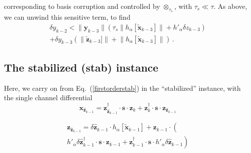 \documentclass[letterpaper,twocolumn,amsmath,amsfont,amssymb,english,aps,jcp,preprintnumbers,groupaddress,nofootinbib,tightenlines,floatfix]{revtex4}
\newcommand{\mat}[1]{\boldsymbol{#1}}
\newcommand{\ots}{ {\scriptstyle \otimes}_{ \! \tau_s } }
\theoremstyle{plain}
\theoremstyle{remark}
\theoremstyle{plain}
\begin{document}

corresponding to  basis corruption and controlled by $\ots$, with $\tau_s \ll \tau$. 
As above, we can unwind this sensitive term, to find 
\begin{multline}
\delta y_{k-2} <   \lVert \mat{y}_{k-3} \rVert  \left( \tau_s \lVert h_\alpha [ \widetilde{\mat{x}}_{k-3}] \rVert + h'_\alpha \delta z_{k-3} \right )\\
+  \delta y_{k-3}  \left( \lVert \widetilde{\mat{z}}_{k-3}]  \rVert + \lVert h_\alpha [ \widetilde{\mat{x}}_{k-3}]  \rVert
  \right)
\, .
\end{multline}


\subsection{The stabilized  (stab) instance}

Here, we carry on from Eq.~(\ref{firstorderstab}) in the ``stabilized'' instance, with the single channel differential 
\begin{equation}
 \mat{x}_{\widehat{\mat{z}}_{k-1}} =   \mat{z}^\dagger_{\widehat{\mat{z}}_{k-1}} \cdot \mat{s} \cdot \mat{z}_{k} + 
                                  \mat{z}^\dagger_k \cdot \mat{s} \cdot \mat{z}_{\widehat{\mat{z}}_{k-1}} 
\end{equation}



\begin{multline}
\mat{z}_{\widehat{\mat{z}}_{k-1} } = \delta \widehat{\mat{z}}_{k-1} \cdot h_\alpha[ \widetilde{\mat{x}}_{k-1} ] + \mat{z}_{k-1} \cdot \left( \right. \\
 \left.  h'_\alpha \delta \widehat{\mat{z}}^\dagger_{k-1} \cdot \mat{s} \cdot \mat{z}_{k-1} +  \mat{z}^\dagger_{k-1} \cdot \mat{s} \cdot h'_\alpha \delta \widehat{\mat{z}}_{k-1}
 \right) 
\end{multline}
\end{document}
